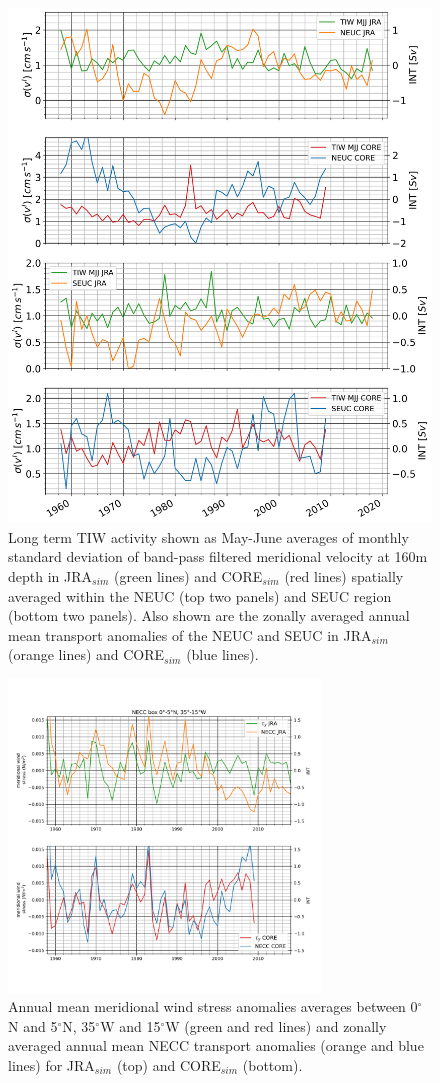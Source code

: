 \documentclass[os, manuscript]{copernicus}
\begin{document}
\clearpage
\begin{figure}[t]
	\includegraphics[width=12cm]{../../figures/paper/fA4_INALT20_JRA_CORE_TIW_NEUC_SEUC_MJJ_ts.png}
	\caption{Long term TIW activity shown as May-June averages of monthly standard deviation of band-pass filtered meridional velocity at 160m depth in JRA$_{sim}$ (green lines) and CORE$_{sim}$ (red lines) spatially averaged within the NEUC (top two panels) and SEUC region (bottom two panels). Also shown are the zonally averaged annual mean transport anomalies of the NEUC and SEUC in JRA$_{sim}$ (orange lines) and CORE$_{sim}$ (blue lines).}
	\label{fig_TIW_long_term}
\end{figure}
\clearpage
\begin{figure}[t]
	\includegraphics[width=8.3cm]{../../figures/paper/fA5_INALT20_JRA_CORE_NECC_tauy_1958_2018.png}
	\caption{Annual mean meridional wind stress anomalies averages between 0$^{\circ}$N and 5$^{\circ}$N, 35$^{\circ}$W and 15$^{\circ}$W (green and red lines) and zonally averaged annual mean NECC transport anomalies (orange and blue lines) for JRA$_{sim}$ (top) and CORE$_{sim}$ (bottom).}
	\label{fig_NECC_tauy}
\end{figure}
\end{document}
